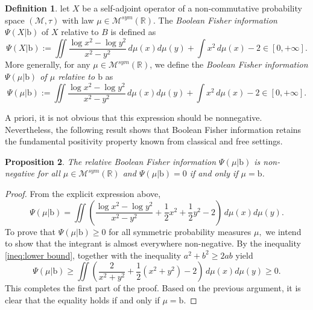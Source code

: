 \documentclass[10pt, reqno]{amsart}
\numberwithin{equation}{section}
\theoremstyle{definition}
\newtheorem{definition}{Definition}[section]
\theoremstyle{plain}
\newtheorem{proposition}[definition]{Proposition}
\theoremstyle{remark}
\newcommand{\R}{\mathbb{R}}
\newcommand{\1}{\mathbbm{1}}
\begin{document}
    \begin{definition}
let $X$ be a self-adjoint operator of a non-commutative probability space $(\mathcal{M},\tau)$ with law $\mu\in\mathcal{M}^{sym}(\R)$. The \textit{Boolean Fisher information} $\Psi(X| \mathbb{\mathrm{b}})$ of $X$ relative to $B$ is defined as
\begin{equation}\label{def:rela fisher}
		\Psi(X|\mathbb{\mathrm{b}}):=\iint \frac{\log x^2-\log y^2}{x^2-y^2}\,d\mu(x)d\mu(y)+\int x^2 \,d\mu(x)  -2\in [0,+\infty].
	\end{equation}
    More generally, for any $\mu \in\mathcal{M}^{sym}(\R)$, we define the \textit{Boolean Fisher information $\Psi(\mu|\mathbb{\mathrm{b}})$ of $\mu$ relative to $\mathbb{\mathrm{b}}$}   as
\begin{equation*}
		\Psi(\mu|\mathbb{\mathrm{b}}):=\iint \frac{\log x^2-\log y^2}{x^2-y^2}\,d\mu(x)d\mu(y)+\int x^2 \,d\mu(x)  -2\in [0,+\infty].
	\end{equation*}
\end{definition}
	A priori, it is not obvious that this expression should be nonnegative. Nevertheless, the following result shows that Boolean Fisher information retains the fundamental positivity property known from classical and free settings.

	\begin{proposition}
		The relative Boolean Fisher information $\Psi(\mu| \mathbb{\mathrm{b}})$ is non-negative for all $\mu\in \mathcal{M}^{sym}(\R)$ and $\Psi(\mu| \mathbb{\mathrm{b}})=0$ if and only if $\mu=\mathbb{\mathrm{b}}$.	
	\end{proposition}
	\begin{proof}
		From the explicit expression above,
		\begin{equation}
			\Psi(\mu|\mathbb{\mathrm{b}})= \iint \left(\frac{\log x^2-\log y^2}{x^2-y^2} + \frac{1}{2}x^2 + \frac{1}{2}y^2 - 2\right)\,d\mu(x)d\mu(y).
		\end{equation}
		To prove that $\Psi(\mu|\mathbb{\mathrm{b}})\geq 0$ for all symmetric probability measures $\mu,$ we intend to show that the integrant is almost everywhere non-negative. By the inequality \eqref{ineq:lower bound}, together with the inequality $a^2+b^2\geq 2ab$ yield
		\begin{equation*}
			\Psi(\mu|\mathbb{\mathrm{b}})\geq \iint \left( \frac{2}{x^2+y^2} + \frac{1}{2}(x^2+y^2) - 2 \right)\,d\mu(x)d\mu(y) \geq 0.
		\end{equation*}
		This completes the first part of the proof. Based on the previous argument, it is clear that the equality holds if and only if $\mu=\mathbb{\mathrm{b}}.$
	\end{proof}
\end{document}
